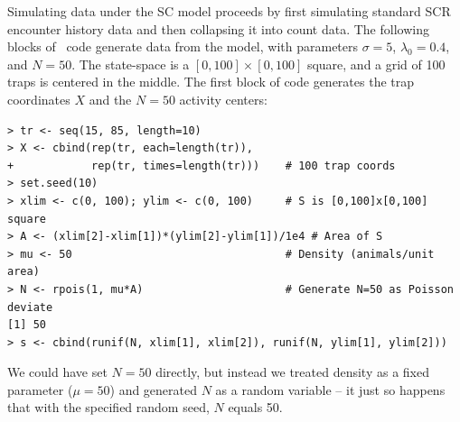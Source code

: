 Simulating data under the SC model proceeds by first simulating
standard SCR encounter history data and then collapsing it into count
data. The following blocks of \R~code generate data from
the model, %
with parameters
$\sigma=5$, $\lambda_0=0.4$, and $N=50$. The state-space is a
$[0, 100] \times [0, 100]$ square, and a grid of 100 traps
is centered in the middle.
The first block of code generates the trap coordinates
$X$ and the $N=50$ activity centers:
\begin{small}
\begin{verbatim}
> tr <- seq(15, 85, length=10)
> X <- cbind(rep(tr, each=length(tr)),
+            rep(tr, times=length(tr)))    # 100 trap coords
> set.seed(10)
> xlim <- c(0, 100); ylim <- c(0, 100)     # S is [0,100]x[0,100] square
> A <- (xlim[2]-xlim[1])*(ylim[2]-ylim[1])/1e4 # Area of S
> mu <- 50                                 # Density (animals/unit area)
> N <- rpois(1, mu*A)                      # Generate N=50 as Poisson deviate
[1] 50
> s <- cbind(runif(N, xlim[1], xlim[2]), runif(N, ylim[1], ylim[2]))
\end{verbatim}
\end{small}
We could have set $N=50$ directly, but instead we treated density
as a fixed parameter ($\mu=50$) and generated $N$ as a random
variable -- it just so happens that with the specified random seed,
$N$ equals 50. %

